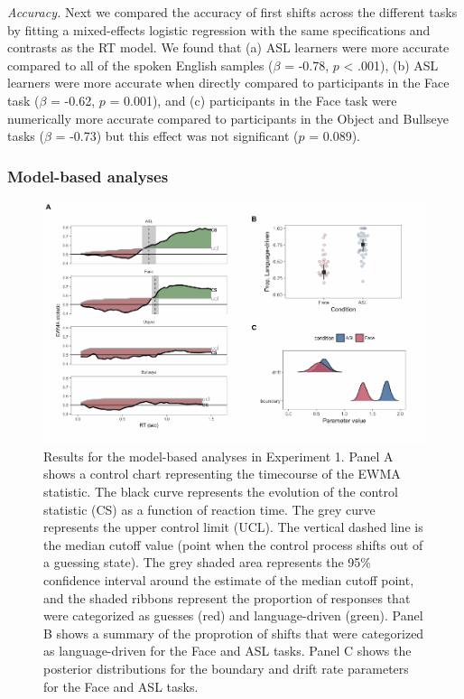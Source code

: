 \documentclass[english,floatsintext,man]{apa6}
\theoremstyle{definition}
\theoremstyle{definition}
\theoremstyle{definition}
\theoremstyle{remark}
\begin{document}
\emph{Accuracy.} Next we compared the accuracy of first shifts across
the different tasks by fitting a mixed-effects logistic regression with
the same specifications and contrasts as the RT model. We found that (a)
ASL learners were more accurate compared to all of the spoken English
samples (\(\beta\) = -0.78, \(p\) \textless{} .001), (b) ASL learners
were more accurate when directly compared to participants in the Face
task (\(\beta\) = -0.62, \(p\) = 0.001), and (c) participants in the
Face task were numerically more accurate compared to participants in the
Object and Bullseye tasks (\(\beta\) = -0.73) but this effect was not
significant (\(p\) = 0.089).

\hypertarget{model-based-analyses}{%
\subsubsection{Model-based analyses}\label{model-based-analyses}}

\begin{figure}[tb]

{\centering \includegraphics[width=0.9\linewidth]{figs/trio-model-plot-1} 

}

\caption{Results for the model-based analyses in Experiment 1. Panel A shows a control chart representing the timecourse of the EWMA statistic. The black curve represents the evolution of the control statistic (CS) as a function of reaction time. The grey curve represents the upper control limit (UCL). The vertical dashed line is the median cutoff value (point when the control process shifts out of a guessing state). The grey shaded area represents the 95\% confidence interval around the estimate of the median cutoff point, and the shaded ribbons represent the proportion of responses that were categorized as guesses (red) and language-driven (green). Panel B shows a summary of the proprotion of shifts that were categorized as language-driven for the Face and ASL tasks. Panel C shows the posterior distributions for the boundary and drift rate parameters for the Face and ASL tasks.}\label{fig:trio-model-plot}
\end{figure}
\end{document}

